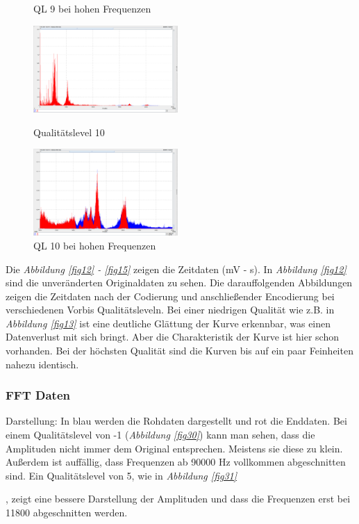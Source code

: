 \documentclass{article}
\begin{document}
{\begin{figure}
\begin{varwidth}[t]{\linewidth}
				\caption{QL 9 bei hohen Frequenzen}
				\label{fig33}
			\end{varwidth}
				\begin{varwidth}[t]{\linewidth}
				\includegraphics[width=0.49\textwidth]{Bilder/9.png}
				\caption{Qualitätslevel 10}
				\label{fig34}
			\end{varwidth}
			\begin{varwidth}[t]{\linewidth}
				\includegraphics[width=0.49\textwidth]{Bilder/10.png}
				\caption{QL 10 bei hohen Frequenzen}
				\label{fig35}
			\end{varwidth}
		\end{figure}
		
			Die \textit{Abbildung \ref{fig12} - \ref{fig15} } zeigen die Zeitdaten (mV - s). In \textit{Abbildung \ref{fig12}} sind die unveränderten Originaldaten zu sehen.  Die darauffolgenden Abbildungen zeigen die Zeitdaten nach der Codierung und anschließender Encodierung bei verschiedenen Vorbis Qualitätsleveln. Bei einer niedrigen Qualität wie z.B. in \textit{Abbildung \ref{fig13}} ist eine deutliche Glättung der Kurve erkennbar, was einen Datenverlust mit sich bringt. Aber die Charakteristik der Kurve ist hier schon vorhanden. Bei der höchsten Qualität sind die Kurven bis auf ein paar Feinheiten nahezu identisch.
			
		\subsubsection{FFT Daten}
			Darstellung: In blau werden die Rohdaten dargestellt und rot die Enddaten.
			Bei einem Qualitätslevel von -1 (\textit{Abbildung \ref{fig30}}) kann man sehen, dass die Amplituden nicht immer dem Original entsprechen. Meistens sie diese zu klein. Außerdem ist auffällig, dass Frequenzen ab 90000 Hz vollkommen abgeschnitten sind.
			Ein Qualitätslevel von 5, wie in \textit{Abbildung \ref{fig31}}}, zeigt eine bessere Darstellung der Amplituden und dass die Frequenzen erst bei 11800 abgeschnitten werden.
\end{document}

